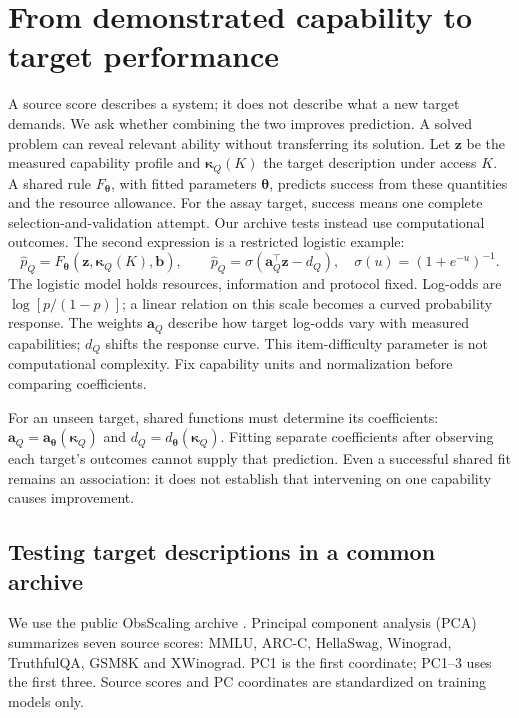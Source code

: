 \section{From demonstrated capability to target performance}
\label{sec:pathways}
A source score describes a system; it does not describe what a new target demands. We ask whether combining the two improves prediction. A solved problem can reveal relevant ability without transferring its solution. Let $\mathbf z$ be the measured capability profile and $\boldsymbol\kappa_Q(K)$ the target description under access $K$. A shared rule $F_{\boldsymbol\theta}$, with fitted parameters $\boldsymbol\theta$, predicts success from these quantities and the resource allowance. For the assay target, success means one complete selection-and-validation attempt. Our archive tests instead use computational outcomes. The second expression is a restricted logistic example:
\begin{equation}
 \widehat p_Q=F_{\boldsymbol\theta}(\mathbf z,\boldsymbol\kappa_Q(K),\mathbf b),\qquad
 \widehat p_Q=\sigma(\mathbf a_Q^\top\mathbf z-d_Q),\quad \sigma(u)=(1+e^{-u})^{-1}.
 \label{eq:bridge}
\end{equation}
\label{eq:logistic}
The logistic model holds resources, information and protocol fixed. Log-odds are $\log[p/(1-p)]$; a linear relation on this scale becomes a curved probability response. The weights $\mathbf a_Q$ describe how target log-odds vary with measured capabilities; $d_Q$ shifts the response curve. This item-difficulty parameter is not computational complexity. Fix capability units and normalization before comparing coefficients.

For an unseen target, shared functions must determine its coefficients: $\mathbf a_Q=\mathbf a_{\boldsymbol\theta}(\boldsymbol\kappa_Q)$ and $d_Q=d_{\boldsymbol\theta}(\boldsymbol\kappa_Q)$. Fitting separate coefficients after observing each target's outcomes cannot supply that prediction. Even a successful shared fit remains an association: it does not establish that intervening on one capability causes improvement.

\subsection{Testing target descriptions in a common archive}
We use the public ObsScaling archive \citep{ruan2024}. Principal component analysis (PCA) summarizes seven source scores: MMLU, ARC-C, HellaSwag, Winograd, TruthfulQA, GSM8K and XWinograd. PC1 is the first coordinate; PC1--3 uses the first three. Source scores and PC coordinates are standardized on training models only. 

